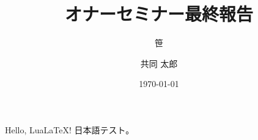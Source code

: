 \documentclass[unicode, aspectratio=169, 10.5pt]{beamer}
\title{オナーセミナー最終報告}
\author{笹 \and 共同 太郎}
\institute{大阪大学 理学部 物理学科}
\date{\today}
\begin{document}
\begin{frame}
    Hello, LuaLaTeX! 日本語テスト。
\end{frame}
\end{document}
